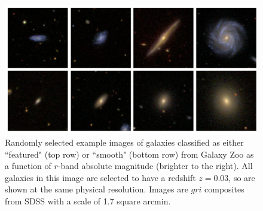 \documentclass[usenatbib]{mn2e}
\begin{document}
\begin{figure}
\includegraphics[width=160mm]{example1.png}
\caption{Randomly selected example images of galaxies classified as either ``featured" (top row) or ``smooth" (bottom row) from Galaxy Zoo as a function of $r$-band absolute magnitude (brighter to the right).  All galaxies in this image are selected to have a redshift $z=0.03$, so are shown at the same physical resolution. Images are $gri$ composites from SDSS with a scale of 1.7 square arcmin.  \label{examples}}
\end{figure}


\end{document}
